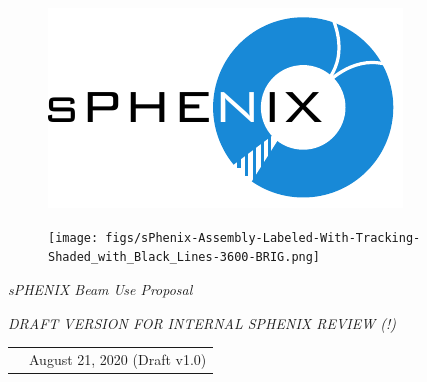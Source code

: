 \renewcommand*\familydefault{\sfdefault}
{\sffamily
\vfill
\vspace{4cm}
\begin{figure}[H]
  \begin{center}
  \includegraphics[width=0.4\linewidth]{figs/sPHENIX}
  \end{center}
\end{figure}

\vfill

\begin{figure}[htpb]
\begin{center}
\texttt{[image: figs/sPhenix-Assembly-Labeled-With-Tracking-Shaded\_with\_Black\_Lines-3600-BRIG.png]}
\end{center}
\end{figure}


\vspace{2cm}

\begin{center}
  \large
  \emph{\Large{sPHENIX Beam Use Proposal}}
  
    \emph{\Large{DRAFT VERSION FOR INTERNAL SPHENIX REVIEW (!)}}

  \begin{tabular}{rl}
&August 21, 2020 (Draft v1.0) \\
  \end{tabular}
\end{center}
}



\renewcommand*\familydefault{\rmdefault}
